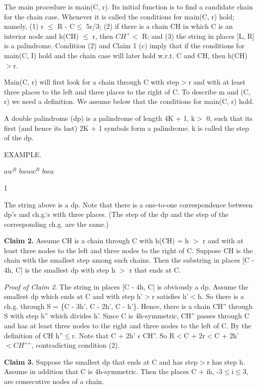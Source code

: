 \documentclass[11pt,a4paper]{report}
\begin{document}
The main procedure is main(C, r). Its initial function is to find a candidate chain for
the chain case. Whenever it is called the conditions for main(C, r) hold; namely, (1) r $\leq$
R - C$\leq$ 5r/3; (2) if there is a chain CH in which C is an interior node and h(CH) $\leq$ r,
then $CH^+ <$ R; and (3) the string in places [L, R] is a palindrome. Condition (2) and
Claim 1 (c) imply that if the conditions for main(C, I) hold and the chain case will later
hold w.r.t. C and CH, then h(CH)$>$r.

Main(C, r) will first look for a chain through C with step$ >$r and with at least three
places to the left and three places to the right of C. To describe m and (C, r) we need a
definition. We assume below that the conditions for main(C, r) hold.

A double palindrome (dp) is a palindrome of length 4K + 1, k$ >$ 0, such that its first
(and hence its last) 2K + 1 symbols form a palindrome. k is called the step of the dp.

EXAMPLE.
\begin{center}
    $aw^R$ $bwaw^R$ $bwa$

    1 
\end{center}


The string above is a dp. Note that there is a one-to-one correspondence between dp’s
and ch.g.‘s with three places. (The step of the dp and the step of the corresponding ch.g.
are the same.)

\textbf{Claim 2.} Assume CH is a chain through C with h(CH) = h $>$ r and with at least
three nodes to the left and three nodes to the right of C. Suppose CH is the chain with 
the smallest step among such chains. Then the substring in places [C - 4h, C] is the smallest
dp with step h $>$ r that ends at C.

\emph{Proof of Claim 2}. The string in places [C - 4h, C] is obviously a dp. Assume the smallest dp
which ends at C and with step h’$>$r satisfies h’$<$h. So there is a ch.g. through S =
\{C - 3h’, C - 2h’, C - h’\}. Hence, there is a chain CH” through S with step h” which
divides h’. Since C is 4h-symmetric, CH” passes through C and has at least three nodes
to the right and three nodes to the left of C. By the definition of CH h”$\leq$r. Note that
C + 2h’ $\epsilon$ CH”. So R$<$C + 2r$<$C + 2h’$<CH”^+$, contradicting condition (2). 

\textbf{Claim 3.} Suppose the smallest dp that ends at C and has step$>$r has step h. Assume
in addition that C is 4h-symmetric. Then the places C + ih, -3$\leq$i$\leq$3, are consecutive
nodes of a chain.
\end{document}
